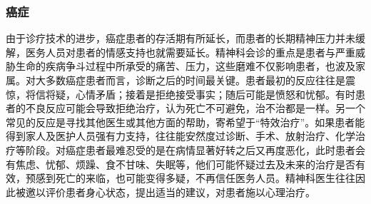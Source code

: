 \subsubsection{癌症}

由于诊疗技术的进步，癌症患者的存活期有所延长，而患者的长期精神压力并未缓解，医务人员对患者的情感支持也就需要延长。精神科会诊的重点是患者与严重威胁生命的疾病争斗过程中所承受的痛苦、压力，这些磨难不仅影响患者，也波及家属。对大多数癌症患者而言，诊断之后的时间最关键。患者最初的反应往往是震惊，将信将疑，心情矛盾；接着是拒绝接受事实；随后可能是愤怒和忧郁。有时患者的不良反应可能会导致拒绝治疗，认为死亡不可避免，治不治都是一样。另一个常见的反应是寻找其他医生或其他方面的帮助，寄希望于“特效治疗”。如果患者能得到家人及医护人员强有力支持，往往能安然度过诊断、手术、放射治疗、化学治疗等阶段。对癌症患者最难忍受的是在病情显著好转之后又再度恶化，此时患者会有焦虑、忧郁、烦躁、食不甘味、失眠等，他们可能怀疑过去及未来的治疗是否有效，预感到死亡的来临，也可能变得多疑，不再信任医务人员。精神科医生往往因此被邀以评价患者身心状态，提出适当的建议，对患者施以心理治疗。